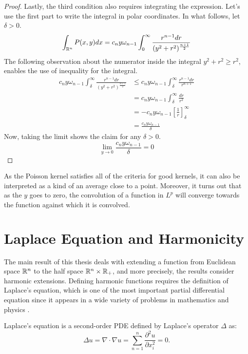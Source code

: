 \begin{proof}
    Lastly, the third condition also requires integrating the expression. Let's use the first part to write the integral in polar coordinates. In what follows, let $\delta>0$.
    \begin{equation*}
        \int_{\mathbb R^n}P(x,y)dx=c_ny\omega_{n-1}\int_0^\infty\frac{r^{n-1}dr}{(y^2+r^2)^{\frac{n+1}{2}}}
    \end{equation*}
    The following observation about the numerator inside the integral $y^2+r^2\geq r^2$, enables the use of inequality for the integral.
    \begin{align*}
        c_ny\omega_{n-1}\int_\delta^\infty\frac{r^{n-1}dr}{(y^2+r^2)^{\frac{n+1}{2}}}&\leq c_ny\omega_{n-1}\int_\delta^\infty\frac{r^{n-1}dr}{r^{n+1}} \\
        &=c_ny\omega_{n-1}\int_\delta^\infty\frac{dr}{r^{2}} \\
        &=-c_ny\omega_{n-1}\left[\frac{1}{r}\right]_\delta^\infty \\
        &=\frac{c_ny\omega_{n-1}}{\delta}
    \end{align*}
    Now, taking the limit shows the claim for any $\delta>0$.
    \begin{equation*}
        \lim_{y\rightarrow0}\frac{c_ny\omega_{n-1}}{\delta}=0
    \end{equation*}
\end{proof}

As the Poisson kernel satisfies all of the criteria for good kernels, it can also be interpreted as a kind of an average close to a point. Moreover, it turns out that as the $y$ goes to zero, the convolution of a function in $L^p$ will converge towards the function against which it is convolved.

\section{Laplace Equation and Harmonicity}

The main result of this thesis deals with extending a function from Euclidean space $\mathbb R^n$ to the half space $\mathbb R^n\times\mathbb R_+$, and more precisely, the results consider harmonic extensions. Defining harmonic functions requires the definition of Laplace's equation, which is one of the most important partial differential equation since it appears in a wide variety of problems in mathematics and physics \cite{evans}.

\begin{definition}
    Laplace's equation is a second-order PDE defined by Laplace's operator $\Delta$ as:
    \begin{equation*}
        \Delta u=\nabla\cdot\nabla u=\sum_{n=1}^n\frac{\partial^2u}{\partial x_i^2}=0.
    \end{equation*}
\end{definition}

